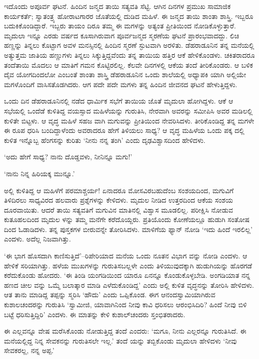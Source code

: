 ಇದೊಂದು ಅಪೂರ್ವ ಘಟನೆ. ಹಿಂದಿನ ಜನ್ಮದ ತಾಯಿ ಸತ್ಯವತಿ ಸೆಟ್ಟಿ. ಆಗಿನ ದಿನಗಳ ಪ್ರಮುಖ ಸಾಮಾಜಿಕ ಕಾರ್ಯಕರ್ತೆ; ಸ್ವಾತಂತ್ರ್ಯ ಹೋರಾಟಗಾರರ ಜೊತೆಯಲ್ಲಿ ದುಡಿದ ಮಹಿಳೆ. ಈ ಜನ್ಮದ ತಾಯಿ ಶಾಂತಾ ಶಾಸ್ತ್ರಿ. ಇಬ್ಬರೂ ಬದುಕಿಕೊಂಡಿದ್ದಾರೆ. ಇಬ್ಬರು ತಾಯಂ ದಿರೂ ತಮ್ಮ ಈ ಮಗಳನ್ನು ಅತ್ಯಂತ ಪ್ರೀತಿಯಿಂದ ನೋಡಿಕೊಳ್ಳುತ್ತಾರೆ. ಮೃದುಲಾ ಇನ್ನೂ ಎರಡು ವರ್ಷದ ಕೂಸಾಗಿರುವಾಗ ಪೂರ್ವಜನ್ಮದ ಸ್ಮರಣೆಯ ಘಟನೆ ಪ್ರಾರಂಭವಾದದ್ದು. ಲಿಚಿ ಹಣ್ಣನ್ನು ತಿನ್ನಲು ಕೊಟ್ಟಾಗ ಅವಳ ಮನಸ್ಸಿನಲ್ಲಿ ಹಿಂದಿನ ಸ್ಮರಣೆ ಸ್ಫುಟವಾಗಿ ಅರಳಿತು. ಡೆಹರಾಡೂನಿನ ತನ್ನ ಮನೆಯಲ್ಲಿ ಅತ್ಯುತ್ತಮ ಜಾತಿಯ ಹಣ್ಣುಗಳು ತಿನ್ನಲು ಸಿಕ್ಕುತ್ತಿದ್ದವೆಂದು ತನ್ನ ತಾಯಿಯ ಹತ್ತಿರ ಆಕೆ ಹೇಳಿಕೊಂಡಳು. ಚಕಿತರಾದರೂ ತಂದೆತಾಯಿ ಮೊದಲು ಆ ಮಾತಿಗೆ ಗಮನ ಕೊಟ್ಟಿರಲಿಲ್ಲ. ಕೆಲವೇ ದಿನಗಳಲ್ಲಿ ಆಕೆಯ ತಂದೆ ತೀರಿಕೊಂಡರು. ಆ ಬಳಿಕ ದೈವ ಯೋಗದಿಂದಲೋ ಎಂಬಂತೆ ಶಾಂತಾ ಶಾಸ್ತ್ರಿ ಡೆಹರಾಡೂನಿನ ಒಂದು ಶಾಲೆಯಲ್ಲಿ ಅಧ್ಯಾಪಕಿ ಯಾಗಿ ಅಲ್ಲಿಯೇ ಮಗಳೊಂದಿಗೆ ವಾಸಿಸತೊಡಗಿದರು. ಆಗ ಪದೇ ಪದೇ ಮಗಳು ತನ್ನ ಹಿಂದಿನ ಜೀವನದ ಘಟನೆ ಹೇಳುತ್ತಿದ್ದಳು.

ಒಂದು ದಿನ ಡೆಹರಾಡೂನಿನಲ್ಲಿ ನಡೆದ ಧಾರ್ಮಿಕ ಸಭೆಗೆ ತಾಯಿಯ ಜೊತೆ ಮೃದುಲಾ ಹೋಗಿದ್ದಳು. ಆಕೆ ಆ ಸಭೆಯಲ್ಲಿ ಒಂದೆಡೆ ಕುಳಿತಿದ್ದ ವಯಸ್ಸಾದ ಮಹಿಳೆಯನ್ನು ಗುರುತಿಸಿ, ನೇರವಾಗಿ ಅವರನ್ನು ಸಮೀಪಿಸಿ ಅವರ ಮಡಿಲಲ್ಲಿ ಕುಳಿತೇ ಬಿಟ್ಟಳು. ಆ ವೃದ್ಧ ಮಹಿಳೆ ಸಹಜ ವಾಗಿ ಮಗುವನ್ನು ಪ್ರೀತಿಯಿಂದ ನೇವರಿಸಿದಳು. ತೀರಿಕೊಂಡಿದ್ದ ತನ್ನ ಮಗಳೇ ಈ ರೂಪ ಧರಿಸಿ ಬಂದಿದ್ದಾಳೆಂದು ಅವರಾದರೂ ಹೇಗೆ ತಿಳಿಯಲು ಸಾಧ್ಯ? ಆ ವೃದ್ಧ ಮಹಿಳೆಯ ಒಂದು ಪಕ್ಕ ದಲ್ಲಿ ಕುಳಿತ ಇನ್ನೊಬ್ಬ ಹೆಂಗಸನ್ನು ಕುರಿತು ‘ನೀನು ನನ್ನ ತಂಗಿ’ ಎಂದು ದೃಢವಿಶ್ವಾಸದಿಂದ ಹೇಳಿದಳು.

‘ಅದು ಹೇಗೆ ಸಾಧ್ಯ? ನಾನು ದೊಡ್ಡವಳು, ನೀನಿನ್ನೂ ಮಗು!’

‘ನಾನು ನಿನ್ನ ಹಿರಿಯಕ್ಕ ಮುನ್ನೂ.’

ಅಲ್ಲಿ ಕುಳಿತಿದ್ದ ಆ ಮಹಿಳೆಗೆ ಪರಮಾಶ್ಚರ್ಯ! ಏನಾದರೂ ಮೋಸವಿರಬಹುದೆಂಬ ಸಂಶಯದಿಂದ, ಮಗುವಿಗೆ ತಿಳಿದಿರಲು ಸಾಧ್ಯವಿರದ ಹಲವಾರು ಪ್ರಶ್ನೆಗಳನ್ನು ಕೇಳಿದಳು. ಮೃದುಲ ನೀಡಿದ ಉತ್ತರದಿಂದ ಆಕೆಯ ಸಂಶಯ ದೂರವಾಯಿತು. ಆದರೆ ತಾಯಿ ಸತ್ಯವತಿಗೆ ಮಗುವಿನ ಮಾತಿನಲ್ಲಿ ವಿಶ್ವಾಸ ಮೂಡಲಿಲ್ಲ. ಪರೀಕ್ಷಿಸಿ ನೋಡುವ ಕುತೂಹಲದಿಂದ ಮೃದುಲ ಳನ್ನು ತಮ್ಮ ಮನೆಗೇ ಕರೆದೊಯ್ದರು. ಪ್ರತಿಯೊಂದು ಕೋಣೆಯಲ್ಲೂ ಹುಡುಗಿ ಸಂತೋಷ ದಿಂದ ಓಡಾಡಿದಳು. ತನ್ನ ಪುಸ್ತಕಗಳ ಬೀರುವನ್ನೇ ತೋರಿಸಿದಳು. ಮಾಳಿಗೆಯ ಫ್ಯಾನ್ ನೋಡಿ ‘ಇದು ಹಿಂದೆ ಇರಲಿಲ್ಲ’ ಎಂದಳು. ಅದೆಲ್ಲ ನಿಜವಾಗಿತ್ತು.

‘ಈ ಭಾಗ ಹೊಸದಾಗಿ ಕಾಣಿಸುತ್ತಿದೆ’–ರಿಪೇರಿಯಾದ ಮನೆಯ ಒಂದು ನೂತನ ವಿಭಾಗ ವನ್ನು ನೋಡಿ ಎಂದಳು. ಆ ಹೇಳಿಕೆ ಸರಿಯಾಗಿತ್ತು. ಹಳೆಯ ಮುಖಗಳನ್ನು ಗುರುತಿಸಬಲ್ಲಳೇ ಎಂದು ತಿಳಿಯುವುದಕ್ಕಾಗಿ ಹುಡುಗಿಯನ್ನು ಹೊರಗಡೆ ಕರೆದುಕೊಂಡು ಹೋದರು. ‘ಈ ತಿಂಡಿ ಯಂಗಡಿಯಿಂದ ಯಾರೂ ಏನನ್ನೂ ಕೊಂಡುಕೊಳ್ಳಬೇಡಿ. ಅಂಗಡಿಯಾತ ನನ್ನ ಹಣದ ಚೀಲ ವನ್ನು ಒಮ್ಮೆ ಬಲಾತ್ಕಾರ ಮಾಡಿ ಎಳೆದುಕೊಂಡಿದ್ದ’ ಎಂದು ಅಲ್ಲಿ ಕುಳಿತ ವೃದ್ಧನನ್ನು ತೋರಿಸಿ ಹೇಳಿದಳು. ಆತ ತಾನು ಮಾಡಿದ್ದ ತಪ್ಪನ್ನು ಸ್ಮರಿಸಿ ‘ಹೌದು’ ಎಂದು ಒಪ್ಪಿಕೊಂಡ. ಈಗ ಆನಂದಸ್ವಾಮಿಯಾಗಿರುವ ಕುಶಾಲಚಂದರನ್ನು ಗುರುತಿಸಿ ‘ಸ್ವಾಮೀಜಿ, ಯಾವಾಗಿನಿಂದ ನೀವು ಕಾವಿ ಧರಿಸಲು ಆರಂಭಿಸಿದಿರಿ? ಹಿಂದೆ ನೀವು ಬಿಳಿ ಬಟ್ಟೆ ಧರಿಸುತ್ತಿದ್ದಿರಿ’ ಎಂದಳು. ಈ ಮಾತನ್ನು ಕೇಳಿ ಕುಶಾಲ್​ಚಂದರು ಸ್ತಂಭಿತರಾದರು.

ಈ ಎಲ್ಲವನ್ನೂ ವೇಷ ಮರೆಸಿಕೊಂಡು ನೋಡುತ್ತಿದ್ದ ತಂದೆ ಎಂದರು: ‘ಮಗೂ, ನೀನು ಎಲ್ಲರನ್ನೂ ಗುರುತಿಸಿದೆ. ಈ ಮನೆಯಲ್ಲಿದ್ದ ನಿನ್ನ ಸೇವಕನನ್ನು ಗುರುತಿಸಲೇ ಇಲ್ಲ.’ ತಂದೆ ಯನ್ನು ತಬ್ಬಿಕೊಂಡು ಮೃದುಲಾ ಹೇಳಿದಳು ‘ನೀವು ಸೇವಕರಲ್ಲ, ನನ್ನ ಅಪ್ಪ.’

